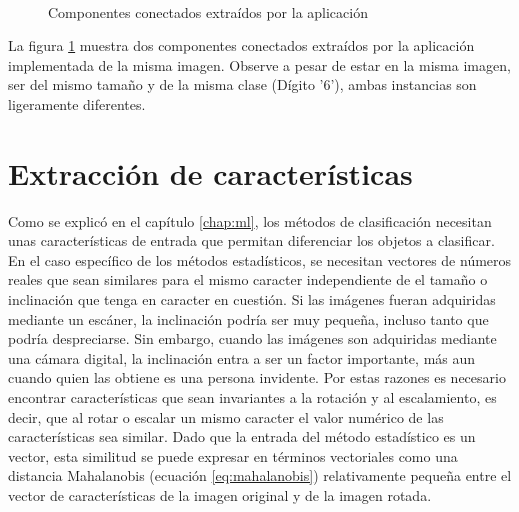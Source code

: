 \documentclass[a4paper, 11pt, oneside]{report}
\begin{document}
	\begin{figure}
	\centering
		\hspace{1cm}
		\\		
	\caption{Componentes conectados extraídos por la aplicación}
	\label{fig:concomp}
	\end{figure}
	
La figura \ref{fig:concomp} muestra dos componentes conectados extraídos por la aplicación implementada de la misma imagen. Observe a pesar de estar en la misma imagen, ser del mismo tamaño y de la misma clase (Dígito '6'), ambas instancias son ligeramente diferentes.

\section{Extracción de características}

Como se explicó en el capítulo \ref{chap:ml}, los métodos de clasificación necesitan unas características de entrada que permitan diferenciar los objetos a clasificar. En el caso específico de los métodos estadísticos, se necesitan vectores de números reales que sean similares para el mismo caracter independiente de el tamaño o inclinación que tenga en caracter en cuestión. Si las imágenes fueran adquiridas mediante un escáner, la inclinación podría ser muy pequeña, incluso tanto que podría despreciarse. Sin embargo, cuando las imágenes son adquiridas mediante una cámara digital, la inclinación entra a ser un factor importante, más aun cuando quien las obtiene es una persona invidente. Por estas razones es necesario encontrar características que sean invariantes a la rotación y al escalamiento, es decir, que al rotar o escalar un mismo caracter el valor numérico de las características sea similar. Dado que la entrada del método estadístico es un vector, esta similitud se puede expresar en términos vectoriales como una distancia Mahalanobis (ecuación \ref{eq:mahalanobis}) relativamente pequeña entre el vector de características de la imagen original y de la imagen rotada.
\end{document}

